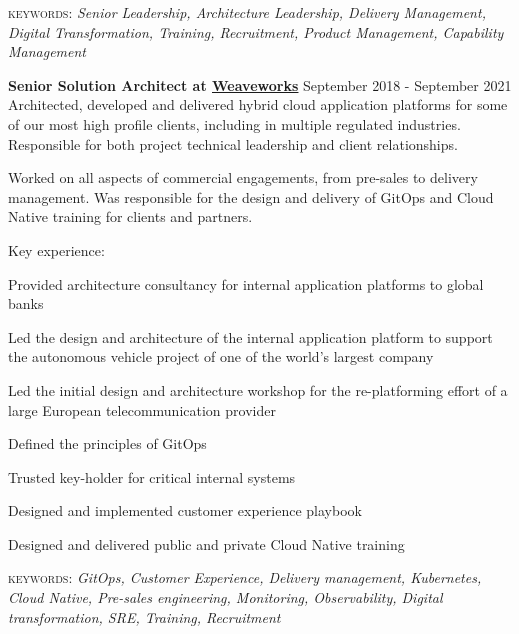 \documentclass[10pt]{article}
\newcommand{\linkto}[2]{\href{#1}{\color{darkblue}\setulcolor{darkblue}\ul{#2}}}
\newcommand{\blankline}{\quad\pagebreak[2]}
\begin{document}
\blankline

{\small \textsc{keywords:} \emph{Senior Leadership, Architecture Leadership, Delivery Management, Digital Transformation, Training, Recruitment, Product Management, Capability Management}}

\blankline

\textbf{Senior Solution Architect at \linkto{https://weave.works}{Weaveworks}} \hfill September 2018 - September 2021\\
Architected, developed and delivered hybrid cloud application platforms for some of our most high profile clients, including in multiple regulated industries. Responsible for both project technical leadership and client relationships. 

\blankline 

Worked on all aspects of commercial engagements, from pre-sales to delivery management. Was responsible for the design and delivery of GitOps and Cloud Native training for clients and partners. 

\blankline 

Key experience:

\begin{myitemize}
        \item Provided architecture consultancy for internal application platforms to global banks
        \item Led the design and architecture of the internal application platform to support the autonomous vehicle project of one of the world's largest company 
        \item Led the initial design and architecture workshop for the re-platforming effort of a large European telecommunication provider
        \item Defined the principles of GitOps
        \item Trusted key-holder for critical internal systems
        \item Designed and implemented customer experience playbook
        \item Designed and delivered public and private Cloud Native training
\end{myitemize}
{\small \textsc{keywords:} \emph{GitOps, Customer Experience, Delivery management, Kubernetes, Cloud Native, Pre-sales engineering, Monitoring, Observability, Digital transformation, SRE, Training, Recruitment}}
\end{document}
